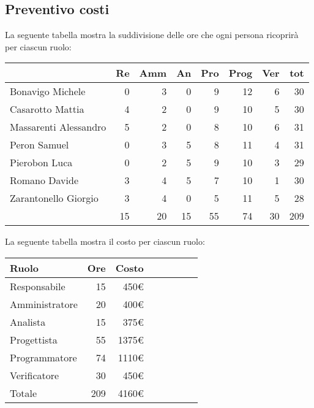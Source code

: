 \subsection{Preventivo costi}

La seguente tabella mostra la suddivisione delle ore che ogni persona ricoprirà per ciascun ruolo:

\begin{table}[H]
    \begin{tabularx}{\linewidth}{X|rrrrrrr}
    \rowcolor{gray!30}& Re & Amm & An & Pro & Prog & Ver & tot \\
    \hline
    Bonavigo Michele                        & 0 & 3 & 0 & 9 & 12 & 6 & 30 \\
    \rowcolor{gray!10}Casarotto Mattia      & 4 & 2 & 0 & 9 & 10 & 5 & 30 \\
    Massarenti Alessandro                   & 5 & 2 & 0 & 8 & 10 & 6 & 31 \\
    \rowcolor{gray!10}Peron Samuel          & 0 & 3 & 5 & 8 & 11 & 4 & 31 \\
    Pierobon Luca                           & 0 & 2 & 5 & 9 & 10 & 3 & 29 \\
    \rowcolor{gray!10}Romano Davide         & 3 & 4 & 5 & 7 & 10 & 1 & 30 \\
    Zarantonello Giorgio                    & 3 & 4 & 0 & 5 & 11 & 5 & 28 \\
    \hline                                  & 15 & 20 & 15 & 55 & 74 & 30 & 209 \\ 
    \end{tabularx}
\end{table}

La seguente tabella mostra il costo per ciascun ruolo:
\begin{table}[H]
    \begin{tabularx}{\linewidth}{X|rrrrrrr}
    \rowcolor{gray!30}Ruolo & Ore & Costo \\
    \hline
    Responsabile                            & 15  & 450€ \\
    \rowcolor{gray!10}Amministratore        & 20 & 400€ \\
    Analista                                & 15  & 375€ \\
    \rowcolor{gray!10}Progettista           & 55  & 1375€ \\
    Programmatore                           & 74 & 1110€ \\
    \rowcolor{gray!10}Verificatore          & 30  & 450€ \\
    \hline Totale                           & 209  & 4160€ \\ 
    \end{tabularx}
\end{table}


